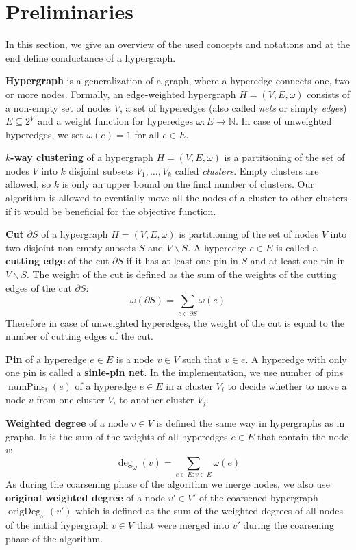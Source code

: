 \documentclass[acmsmall,nonacm,screen,review]{acmart}
\DeclareMathOperator{\origDeg}{origDeg}
\DeclareMathOperator{\numPins}{numPins}
\begin{document}
\section{Preliminaries}
\label{sec:preliminaries}

In this section, we give an overview of the used concepts and 
notations and at the end define conductance of a hypergraph.

\smallbreak
\noindent\textbf{Hypergraph} is a generalization of a graph, where a 
hyperedge connects one, two or more nodes. Formally, an edge-weighted 
hypergraph $H = (V, E, \omega)$ consists of a non-empty set of nodes 
$V$, a set of hyperedges (also called \textit{nets} or simply 
\textit{edges}) $E \subseteq 2^V$ and a weight function for 
hyperedges $\omega: E \to \mathbb{N}$. In case of unweighted 
hyperedges, we set $\omega(e) = 1$ for all $e \in E$. 

\smallbreak
\noindent\textbf{$k$-way clustering} of a hypergraph 
$H = (V, E,\omega)$ is a partitioning of the set of nodes $V$ into 
$k$ disjoint subsets $V_1, \dots, V_k$ called \textit{clusters}. Empty 
clusters are allowed, so $k$ is only an upper bound on the final 
number of clusters. Our algorithm is allowed to eventially move all 
the nodes of a cluster to other clusters if it would be beneficial 
for the objective function. 

\smallbreak
\noindent\textbf{Cut} $\partial S$ of a hypergraph 
$H = (V, E, \omega)$ is partitioning of the set of nodes $V$ into 
two disjoint non-empty subsets $S$ and $V \backslash S$. A hyperedge 
$e \in E$ is called a \textbf{cutting edge} of the cut $\partial S$ 
if it has at least one pin in $S$ and at least one pin in 
$V \backslash S$. The weight of the cut is defined as the sum of the 
weights of the cutting edges of the cut $\partial S$: 
\[\omega(\partial S) = \sum_{e \in \partial S} \omega(e)\]
Therefore in case of unweighted hyperedges, the weight of the cut is 
equal to the number of cutting edges of the cut.

\smallbreak
\noindent\textbf{Pin} of a hyperedge $e \in E$ is a node $v \in V$ 
such that $v \in e$. A hyperedge with only one pin is called a 
\textbf{sinle-pin net}. In the implementation, we use number of pins 
$\numPins_i(e)$ of a hyperedge $e \in E$ in a cluster $V_i$ to decide 
whether to move a node $v$ from one cluster $V_i$ to another cluster 
$V_j$.

\smallbreak
\noindent\textbf{Weighted degree} of a node $v \in V$ is defined the 
same way in hypergraphs as in graphs. It is the sum of the weights of 
all hyperedges $e \in E$ that contain the node $v$: 
\[\deg_\omega(v) = \sum_{e\in E: v \in E} \omega(e)\]
As during the coarsening phase of the algorithm we merge nodes, we 
also use \textbf{original weighted degree} of a node $v' \in V'$ 
of the coarsened hypergraph $\origDeg_\omega(v')$ which is defined as 
the sum of the weighted degrees of all nodes of the initial hypergraph 
$v \in V$ that were merged into $v'$ during the coarsening phase of 
the algorithm.
\end{document}
